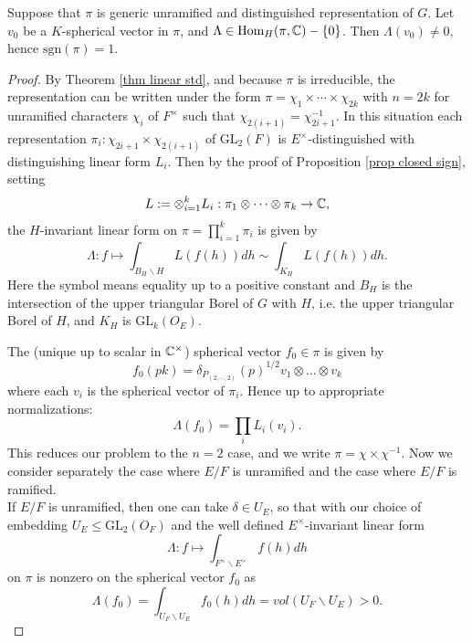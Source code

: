 \documentclass[11pt,letterpaper]{amsart}
\newcommand{\GL}{{\mathrm {GL}}} \newcommand{\PGL}{{\mathrm {PGL}}}
\newcommand{\Hom}{\mathrm{Hom}}
\theoremstyle{plain}
\numberwithin{equation}{section}
\newcommand{\sg}{\mathrm{sgn}}
\begin{document}
\begin{prop}\label{prop UR sign}
Suppose that $\pi$ is generic unramified and distinguished representation of $G$. Let $v_0$ be a $K$-spherical vector in $\pi$, and $\Lambda\in \Hom_H(\pi,\BC)-\{0\}$. Then 
$\Lambda(v_0)\neq 0$, hence $\sg(\pi)=1$.
\end{prop}
\begin{proof}
By Theorem \ref{thm linear std}, and because $\pi$ is irreducible, the representation can be written under the form $\pi=\chi_1\times \cdots\times \chi_{2k}$ with $n=2k$ for unramified characters $\chi_i$ of $F^\times$ such that $\chi_{2(i+1)}=\chi_{2i+1}^{-1}$. In this situation each representation $\pi_i:\chi_{2i+1}\times \chi_{2(i+1)}$ of $\GL_2(F)$ is $E^\times$-distinguished with distinguishing linear form $L_i$. Then by the proof of Proposition \ref{prop closed sign}, setting \[L:=\otimes_{i=1}^k L_i:\pi_1\otimes \dots \otimes \pi_k\rightarrow {\mathbb {C}},\] 
the $H$-invariant linear form on $\pi=\prod_{i=1}^k \pi_i$ is given by 
\[\Lambda: f\mapsto \int_{B_H\backslash H} L(f(h))dh\sim \int_{K_H} L(f(h))dh .\] Here the symbol \say{$\sim$} means equality up to a positive constant
and $B_H$ is the intersection of the upper triangular Borel of $G$ with $H$, i.e. the upper triangular Borel of $H$, and $K_H$ is $\GL_k(O_E)$. 

The (unique up to scalar in ${\mathbb {C}}^\times$) spherical vector $f_0\in \pi$ is given by 
\[f_0(pk)=\delta_{P_{(2,\cdots,2)}}(p)^{1/2}v_1\otimes \dots \otimes v_k\] where each $v_i$ is the spherical vector of $\pi_i$. Hence up to appropriate normalizations: 
\[\Lambda(f_0)=\prod_i L_i(v_i).\]
This reduces our problem to the $n=2$ case, and we write $\pi=\chi\times \chi^{-1}$. Now we consider separately the case where $E/F$ is unramified and the case where $E/F$ is ramified. \\

If $E/F$ is unramified, then one can take $\delta\in U_E$, so that with our choice of embedding $U_E\leq \GL_2(O_F)$ 
and the well defined $E^\times$-invariant linear form \[\Lambda:f\mapsto \int_{F^\times \backslash E^\times} f(h)dh\] on 
$\pi$ is nonzero on the spherical vector $f_0$ as 
\[\Lambda(f_0)=\int_{U_F \backslash U_E} f_0(h)dh=vol(U_F \backslash U_E)>0.\]


\end{proof}
\end{document}

